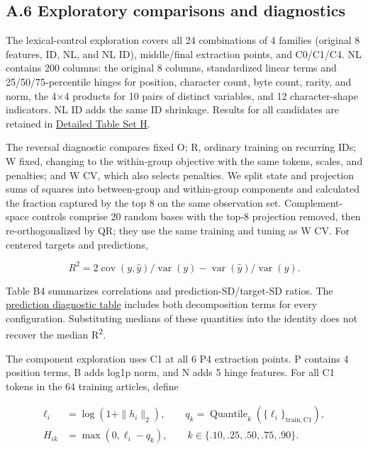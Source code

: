 \FloatBarrier

\subsection{A.6 Exploratory comparisons and diagnostics}\label{a.6-exploratory-comparisons-and-diagnostics}

The lexical-control exploration covers all 24 combinations of 4 families (original 8 features, ID, NL, and NL ID), middle/final extraction points, and C0/C1/C4. NL contains 200 columns: the original 8 columns, standardized linear terms and 25/50/75-percentile hinges for position, character count, byte count, rarity, and norm, the 4×4 products for 10 pairs of distinct variables, and 12 character-shape indicators. NL ID adds the same ID shrinkage. Results for all candidates are retained in \href{https://github.com/metaSATOKEN/manifold_topology_experiment/blob/main/references/tables/appendix_H.md}{Detailed Table Set H}.

The reversal diagnostic compares fixed O; R, ordinary training on recurring IDs; W fixed, changing to the within-group objective with the same tokens, scales, and penalties; and W CV, which also selects penalties. We split state and projection sums of squares into between-group and within-group components and calculated the fraction captured by the top 8 on the same observation set. Complement-space controls comprise 20 random bases with the top-8 projection removed, then re-orthogonalized by QR; they use the same training and tuning as W CV. For centered targets and predictions,

\[R^2=2\operatorname{cov}(y,\hat y)/\operatorname{var}(y)-\operatorname{var}(\hat y)/\operatorname{var}(y).\]

Table B4 summarizes correlations and prediction-SD/target-SD ratios. The \href{https://github.com/metaSATOKEN/manifold_topology_experiment/blob/main/references/tables/prediction_diagnostics.md}{prediction diagnostic table} includes both decomposition terms for every configuration. Substituting medians of these quantities into the identity does not recover the median {R\textsuperscript{2}.}

The component exploration uses C1 at all 6 P4 extraction points. P contains 4 position terms, B adds log1p norm, and N adds 5 hinge features. For all C1 tokens in the 64 training articles, define

\[\begin{aligned}
\ell_i&=\log(1+\|h_i\|_2),\qquad q_k=\operatorname{Quantile}_{k}(\{\ell_i\}_{\mathrm{train,C1}}),\\
H_{ik}&=\max(0,\ell_i-q_k),\qquad k\in\{.10,.25,.50,.75,.90\}.
\end{aligned}\]

